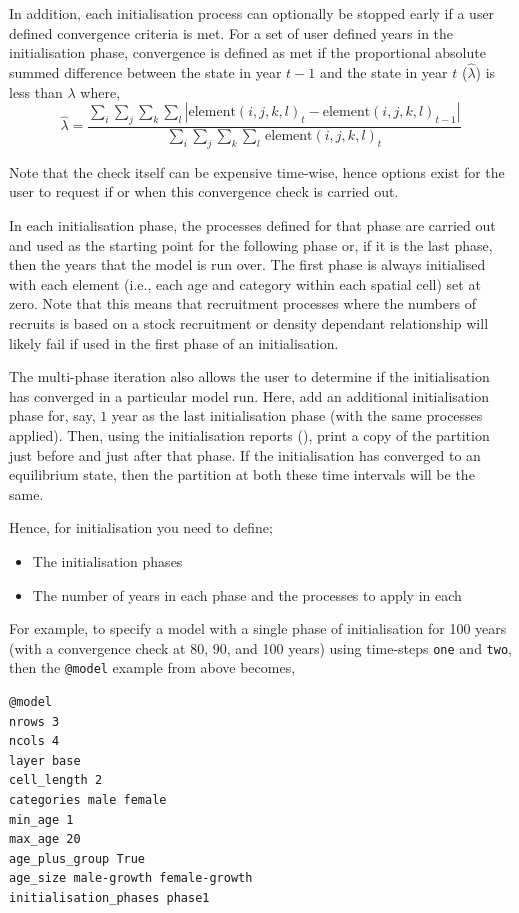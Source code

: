 In addition, each initialisation process can optionally be stopped early if a user defined convergence criteria is met. For a set of user defined years in the initialisation phase, convergence is defined as met if the proportional absolute summed difference between the state in year $t-1$ and the state in year $t$ ($\widehat{\lambda}$) is less than $\lambda$ where, 
\begin{equation}
  \widehat{\lambda} = \frac{\sum\limits_{i} \sum\limits_{j} \sum\limits_{k} \sum\limits_l \left|\text{element}(i,j,k,l)_t - \text{element}(i,j,k,l)_{t-1} \right|}{\sum\limits_{i} \sum\limits_{j} \sum\limits_{k} \sum\limits_l \frac{}{}\text{element}(i,j,k,l)_t}
\end{equation}

Note that the check itself can be expensive time-wise, hence options exist for the user to request if or when this convergence check is carried out.

In each initialisation phase, the processes defined for that phase are carried out and used as the starting point for the following phase or, if it is the last phase, then the years that the model is run over. The first phase is always initialised with each element (i.e., each age and category within each spatial cell) set at zero. Note that this means that recruitment processes where the numbers of recruits is based on a stock recruitment or density dependant relationship will likely fail if used in the first phase of an initialisation. 

The multi-phase iteration also allows the user to determine if the initialisation has converged in a particular model run. Here, add an additional initialisation phase for, say, $1$ year as the last initialisation phase (with the same processes applied). Then, using the initialisation reports (), print a copy of the partition just before and just after that phase. If the initialisation has converged to an equilibrium state, then the partition at both these time intervals will be the same.

Hence, for initialisation you need to define;
\begin{itemize}
  \item The initialisation phases
  \item The number of years in each phase and the processes to apply in each
\end{itemize}

For example, to specify a model with a single phase of initialisation for 100 years (with a convergence check at 80, 90, and 100 years) using time-steps \texttt{one} and \texttt{two}, then the \texttt{@model} example from above becomes,
{\small{\begin{verbatim}
@model
nrows 3
ncols 4
layer base
cell_length 2
categories male female
min_age 1
max_age 20
age_plus_group True
age_size male-growth female-growth
initialisation_phases phase1
\end{verbatim}}}

